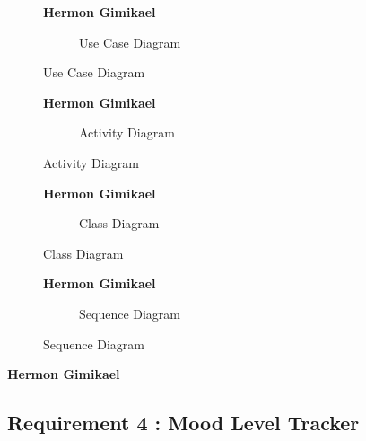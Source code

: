 \documentclass{article}
\begin{document}
\clearpage

\begin{figure}[htbp]
    \textbf{Hermon Gimikael}
    \centering
    \begin{subfigure}{\textwidth}
        \resizebox{\textwidth}{!}{}
        \caption{Use Case Diagram}
    \end{subfigure}
\end{figure}

\clearpage

\begin{figure}[htbp]
    \textbf{Hermon Gimikael}
    \centering
    \begin{subfigure}{\textwidth}
        \resizebox{\textwidth}{!}{}
		\caption{Activity Diagram}
	\end{subfigure}
\end{figure}

\clearpage

\begin{figure}[htbp]
    \textbf{Hermon Gimikael}
    \centering
    \begin{subfigure}{\textwidth}
        
        \caption{Class Diagram}
    \end{subfigure}
\end{figure}

\clearpage

\begin{figure}[htbp]
    \textbf{Hermon Gimikael}
    \centering
    \begin{subfigure}{\textwidth}
        
        \caption{Sequence Diagram}
    \end{subfigure}
\end{figure}

\clearpage

\textbf{Hermon Gimikael}
\subsection{Requirement 4 : Mood Level Tracker}
\end{document}
